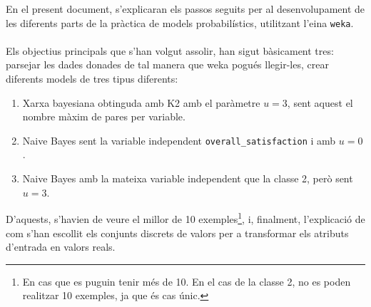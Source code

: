 
En el present document, s'explicaran els passos seguits per al desenvolupament de les diferents parts de la pràctica de models probabilístics, utilitzant l'eina \texttt{weka}.\\\\
Els objectius principals que s'han volgut assolir, han sigut bàsicament tres: parsejar les dades donades de tal manera que weka pogués llegir-les, crear diferents models de tres tipus diferents: 
\begin{enumerate}
	\item Xarxa bayesiana obtinguda amb K2 amb el paràmetre $u=3$, sent aquest el nombre màxim de pares per variable.
	\item Naive Bayes sent la variable independent \texttt{overall\_satisfaction} i amb $u=0$.
	\item Naive Bayes amb la mateixa variable independent que la classe 2, però sent $u=3$.
\end{enumerate}
D'aquests, s'havien de veure el millor de 10 exemples\footnote{En cas que es puguin tenir més de 10. En el cas de la classe 2, no es poden realitzar 10 exemples, ja que és cas únic.}, i, finalment, l'explicació de com s'han escollit els conjunts discrets de valors per a transformar els atributs d'entrada en valors reals. 
